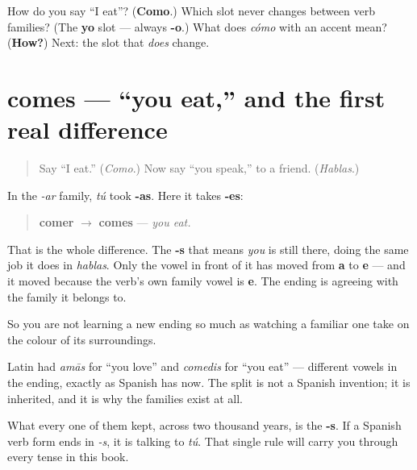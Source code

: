 \begin{tcolorbox}[breakable,colback=teal!4,colframe=teal!35!black,title={Before you move on}]
How do you say \textquotedblleft{}I eat\textquotedblright{}? (\textbf{Como}.) Which slot never changes between verb families? (The \textbf{yo} slot — always \textbf{-o}.) What does \emph{cómo} with an accent mean? (\textbf{How?}) Next: the slot that \emph{does} change.
\end{tcolorbox}
\section[comes]{comes — \textquotedblleft{}you eat,\textquotedblright{} and the first real difference}

\label{lesson:ES-C07-comes}



\begin{quote}
Say \textquotedblleft{}I eat.\textquotedblright{} (\emph{Como}.) Now say \textquotedblleft{}you speak,\textquotedblright{} to a friend. (\emph{Hablas}.)
\end{quote}

\begin{grammarlens}[title={Grammar Lens: one vowel moves}]
In the \emph{-ar} family, \emph{tú} took \textbf{-as}. Here it takes \textbf{-es}:

\begin{quote}
\textbf{comer} $\to$ \textbf{comes} — \emph{you eat.}
\end{quote}

That is the whole difference. The \textbf{-s} that means \emph{you} is still there, doing the same job it does in \emph{hablas}. Only the vowel in front of it has moved from \textbf{a} to \textbf{e} — and it moved because the verb's own family vowel is \textbf{e}. The ending is agreeing with the family it belongs to.

So you are not learning a new ending so much as watching a familiar one take on the colour of its surroundings.
\end{grammarlens}

\begin{cousinweb}
Latin had \emph{amās} for \textquotedblleft{}you love\textquotedblright{} and \emph{comedis} for \textquotedblleft{}you eat\textquotedblright{} — different vowels in the ending, exactly as Spanish has now. The split is not a Spanish invention; it is inherited, and it is why the families exist at all.

What every one of them kept, across two thousand years, is the \textbf{-s}. If a Spanish verb form ends in \emph{-s}, it is talking to \emph{tú}. That single rule will carry you through every tense in this book.
\end{cousinweb}

